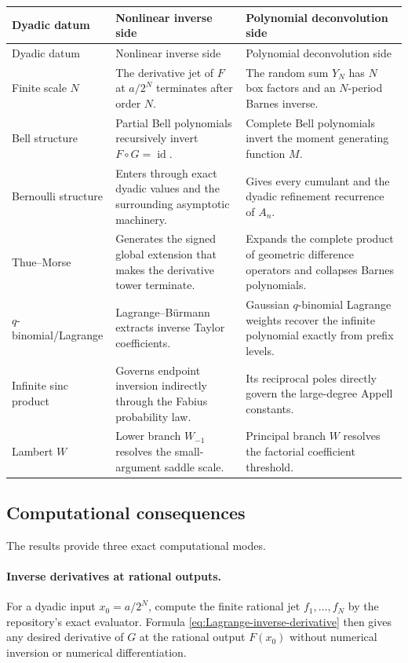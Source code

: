 \documentclass[11pt,oneside]{article}
\theoremstyle{frontier}
\theoremstyle{definition}
\theoremstyle{remark}
\begin{document}
\begin{longtable}{@{}p{}p{}p{}@{}}
\toprule
Dyadic datum & Nonlinear inverse side & Polynomial deconvolution side \\
\midrule
\endfirsthead
\toprule
Dyadic datum & Nonlinear inverse side & Polynomial deconvolution side \\
\midrule
\endhead
Finite scale $N$
& The derivative jet of $F$ at $a/2^N$ terminates after order $N$.
& The random sum $Y_N$ has $N$ box factors and an $N$-period Barnes inverse. \\
\addlinespace
Bell structure
& Partial Bell polynomials recursively invert $F\circ G=\operatorname{id}$.
& Complete Bell polynomials invert the moment generating function $M$. \\
\addlinespace
Bernoulli structure
& Enters through exact dyadic values and the surrounding asymptotic machinery.
& Gives every cumulant and the dyadic refinement recurrence of $A_n$. \\
\addlinespace
Thue--Morse
& Generates the signed global extension that makes the derivative tower terminate.
& Expands the complete product of geometric difference operators and collapses Barnes polynomials. \\
\addlinespace
$q$-binomial/Lagrange
& Lagrange--B\"urmann extracts inverse Taylor coefficients.
& Gaussian $q$-binomial Lagrange weights recover the infinite polynomial exactly from prefix levels. \\
\addlinespace
Infinite sinc product
& Governs endpoint inversion indirectly through the Fabius probability law.
& Its reciprocal poles directly govern the large-degree Appell constants. \\
\addlinespace
Lambert $W$
& Lower branch $W_{-1}$ resolves the small-argument saddle scale.
& Principal branch $W$ resolves the factorial coefficient threshold. \\
\bottomrule
\end{longtable}

\subsection{Computational consequences}

The results provide three exact computational modes.

\paragraph{Inverse derivatives at rational outputs.}
For a dyadic input $x_0=a/2^N$, compute the finite rational jet $f_1,\ldots,f_N$ by the repository's
exact evaluator.  Formula \eqref{eq:Lagrange-inverse-derivative} then gives any desired derivative of
$G$ at the rational output $F(x_0)$ without numerical inversion or numerical differentiation.
\end{document}
